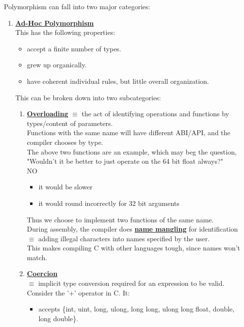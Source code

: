 \documentclass[../../lecture_notes.tex]{subfiles}
\begin{document}
Polymorphism can fall into two major categories:
\begin{enumerate} [itemsep=0mm]
	\item \textbf{\underline{Ad-Hoc Polymorphism}}\\
		This has the following properties:
			\begin{itemize} [itemsep=0mm]
				\item accept a finite number of types.
				\item grew up organically.
				\item have coherent individual rules, but little overall organization.
			\end{itemize}
		This can be broken down into two subcategories:
		\begin{enumerate} [itemsep=0mm]
			\item \textbf{\underline{Overloading}}
				$\equiv$ the act of identifying operations and functions by types/content of parameters.\\
				Functions with the same name will have different ABI/API, and the compiler chooses by type.\\
				The above two functions are an example, which may beg the question,\\
					"Wouldn't it be better to just operate on the 64 bit float always?"\\
				\indent NO 
					\begin{itemize} [itemsep=0mm]
						\item it would be slower
						\item it would round incorrectly for 32 bit arguments
					\end{itemize}
				Thus we choose to implement two functions of the same name.\\
				During assembly, the compiler does \textbf{\underline{name mangling}} for identification\\
					\indent $\equiv$ adding illegal characters into names specified by the user.\\
					\indent This makes compiling C with other languages tough, since names won't match.
			\item \textbf{\underline{Coercion}}\\
				$\equiv$ implicit type conversion required for an expression to be valid.\\
				Consider the '+' operator in C.  It:
				\begin{itemize} [itemsep=0mm]
					\item accepts \{int, uint, long, ulong, long long, ulong long float, double, long double\}.

\end{itemize}
\end{enumerate}
\end{enumerate}
\end{document}
